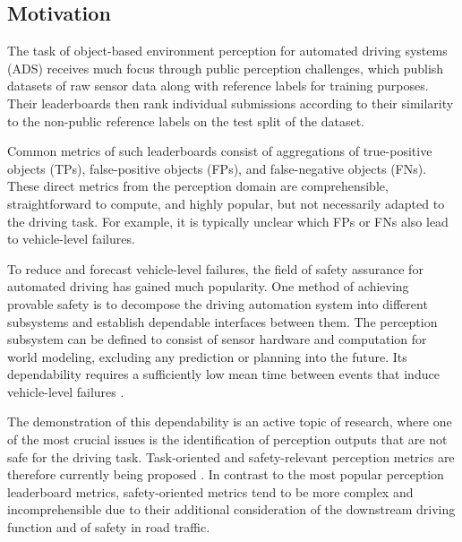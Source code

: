 \documentclass[conference]{IEEEtran}
\begin{document}
\subsection{Motivation}

The task of object-based environment perception for automated driving systems (ADS) receives much focus through public perception challenges, %
which publish datasets of raw sensor data along with reference labels for training purposes. 
Their leaderboards then rank individual submissions according to their similarity to the non-public reference labels on the test split of the dataset.

Common metrics of such leaderboards consist of aggregations of true-positive objects (TPs), false-positive objects (FPs), and false-negative objects (FNs). 
These direct metrics from the perception domain are comprehensible, straightforward to compute, and highly popular, but not necessarily adapted to the driving task. 
For example, it is typically unclear which FPs or FNs also lead to vehicle-level failures. 

To reduce and forecast vehicle-level failures, the field of safety assurance for automated driving has gained much popularity. 
One method of achieving provable safety is to decompose the driving automation system into different subsystems and establish dependable interfaces between them. 
The perception subsystem can be defined to consist of sensor hardware and computation for world modeling, excluding any prediction or planning into the future. 
Its dependability requires a sufficiently low mean time between events that induce vehicle-level failures \cite{Oboril2022mtbf_ieee}. 


The demonstration of this dependability is an active topic of research, where one of the most crucial issues is the identification of perception outputs that are not safe for the driving task. 
Task-oriented and safety-relevant perception metrics are therefore currently being proposed \cite[Sec. VI-C3]{Hoss2023rollingreview}. 
In contrast to the most popular perception leaderboard metrics, safety-oriented metrics tend to be more complex and incomprehensible due to their additional consideration of the downstream driving function and of safety in road traffic. 
\end{document}
